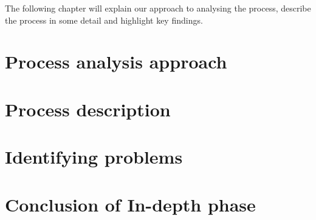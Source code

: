 The following chapter will explain our approach to analysing the process, describe the process in some detail and highlight key findings.

\section{Process analysis approach}

\section{Process description}

\section{Identifying problems}

\section{Conclusion of In-depth phase}
